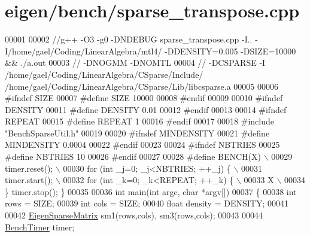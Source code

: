 \hypertarget{eigen_2bench_2sparse__transpose_8cpp_source}{}\section{eigen/bench/sparse\+\_\+transpose.cpp}
\label{eigen_2bench_2sparse__transpose_8cpp_source}

\begin{DoxyCode}
00001 
00002 \textcolor{comment}{//g++ -O3 -g0 -DNDEBUG  sparse\_transpose.cpp -I.. -I/home/gael/Coding/LinearAlgebra/mtl4/ -DDENSITY=0.005
       -DSIZE=10000 && ./a.out}
00003 \textcolor{comment}{// -DNOGMM -DNOMTL}
00004 \textcolor{comment}{// -DCSPARSE -I /home/gael/Coding/LinearAlgebra/CSparse/Include/
       /home/gael/Coding/LinearAlgebra/CSparse/Lib/libcsparse.a}
00005 
00006 \textcolor{preprocessor}{#ifndef SIZE}
00007 \textcolor{preprocessor}{#define SIZE 10000}
00008 \textcolor{preprocessor}{#endif}
00009 
00010 \textcolor{preprocessor}{#ifndef DENSITY}
00011 \textcolor{preprocessor}{#define DENSITY 0.01}
00012 \textcolor{preprocessor}{#endif}
00013 
00014 \textcolor{preprocessor}{#ifndef REPEAT}
00015 \textcolor{preprocessor}{#define REPEAT 1}
00016 \textcolor{preprocessor}{#endif}
00017 
00018 \textcolor{preprocessor}{#include "BenchSparseUtil.h"}
00019 
00020 \textcolor{preprocessor}{#ifndef MINDENSITY}
00021 \textcolor{preprocessor}{#define MINDENSITY 0.0004}
00022 \textcolor{preprocessor}{#endif}
00023 
00024 \textcolor{preprocessor}{#ifndef NBTRIES}
00025 \textcolor{preprocessor}{#define NBTRIES 10}
00026 \textcolor{preprocessor}{#endif}
00027 
00028 \textcolor{preprocessor}{#define BENCH(X) \(\backslash\)}
00029 \textcolor{preprocessor}{  timer.reset(); \(\backslash\)}
00030 \textcolor{preprocessor}{  for (int \_j=0; \_j<NBTRIES; ++\_j) \{ \(\backslash\)}
00031 \textcolor{preprocessor}{    timer.start(); \(\backslash\)}
00032 \textcolor{preprocessor}{    for (int \_k=0; \_k<REPEAT; ++\_k) \{ \(\backslash\)}
00033 \textcolor{preprocessor}{        X  \(\backslash\)}
00034 \textcolor{preprocessor}{  \} timer.stop(); \}}
00035 
00036 \textcolor{keywordtype}{int} main(\textcolor{keywordtype}{int} argc, \textcolor{keywordtype}{char} *argv[])
00037 \{
00038   \textcolor{keywordtype}{int} rows = SIZE;
00039   \textcolor{keywordtype}{int} cols = SIZE;
00040   \textcolor{keywordtype}{float} density = DENSITY;
00041 
00042   \hyperlink{group___sparse_core___module}{EigenSparseMatrix} sm1(rows,cols), sm3(rows,cols);
00043 
00044   \hyperlink{class_eigen_1_1_bench_timer}{BenchTimer} timer;

\end{DoxyCode}
